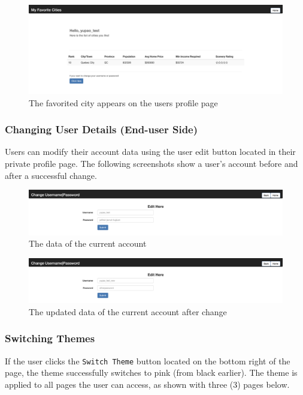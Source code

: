 \documentclass[12pt, letterpaper]{article}
\begin{document}
 \begin{figure}[htbp]
	\centering
	\includegraphics[width=\textwidth]{images/30-journey-e06b.png}
	\caption{The favorited city appears on the users profile page}
 \end{figure}

 \newpage
 \subsubsection*{Changing User Details (End-user Side)}
Users can modify their account data using the user edit button located in their private profile page. The following screenshots show a user's account before and after a successful change.

\begin{figure}[htbp]
	\centering
	\includegraphics[width=\textwidth]{images/30-journey-e07a.png}
	\caption{The data of the current account}
 \end{figure}

 \begin{figure}[htbp]
	\centering
	\includegraphics[width=\textwidth]{images/30-journey-e07b.png}
	\caption{The updated data of the current account after change}
 \end{figure}

 \newpage
 \subsubsection*{Switching Themes}
If the user clicks the \lstinline{Switch Theme} button located on the bottom right of the page, the theme successfully switches to pink (from black earlier). The theme is applied to all pages the user can access, as shown with three (3) pages below.
\end{document}
